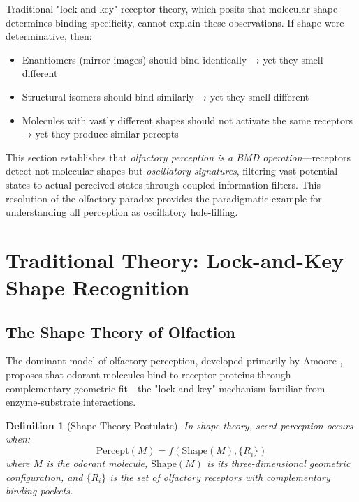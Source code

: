 \documentclass[11pt]{article}
\newtheorem{definition}[theorem]{Definition}
\theoremstyle{remark}
\begin{document}
Traditional "lock-and-key" receptor theory, which posits that molecular shape determines binding specificity, cannot explain these observations. If shape were determinative, then:
\begin{itemize}
\item Enantiomers (mirror images) should bind identically → yet they smell different
\item Structural isomers should bind similarly → yet they smell different
\item Molecules with vastly different shapes should not activate the same receptors → yet they produce similar percepts
\end{itemize}

This section establishes that \textit{olfactory perception is a BMD operation}—receptors detect not molecular shapes but \textit{oscillatory signatures}, filtering vast potential states to actual perceived states through coupled information filters. This resolution of the olfactory paradox provides the paradigmatic example for understanding all perception as oscillatory hole-filling.

\section{Traditional Theory: Lock-and-Key Shape Recognition}

\subsection{The Shape Theory of Olfaction}

The dominant model of olfactory perception, developed primarily by Amoore \cite{amoore1964stereochemical}, proposes that odorant molecules bind to receptor proteins through complementary geometric fit—the "lock-and-key" mechanism familiar from enzyme-substrate interactions.

\begin{definition}[Shape Theory Postulate]
\label{def:shape_theory}
In shape theory, scent perception occurs when:
\begin{equation}
\text{Percept}(M) = f(\text{Shape}(M), \{R_i\})
\end{equation}
where $M$ is the odorant molecule, $\text{Shape}(M)$ is its three-dimensional geometric configuration, and $\{R_i\}$ is the set of olfactory receptors with complementary binding pockets.
\end{definition}
\end{document}
